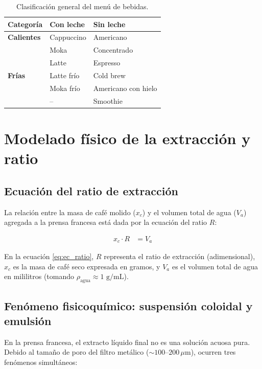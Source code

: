 \documentclass{article}
\begin{document}
\begin{table}[H]
	\centering
	\caption{Clasificación general del menú de bebidas.}
	\label{tab:menu_bebidas}
	\vspace{6pt}
	\begin{tabular}{lll}
		\toprule
		\textbf{Categoría} & \textbf{Con leche} & \textbf{Sin leche} \\
		\midrule
		\textbf{Calientes} & Cappuccino & Americano \\
		& Moka & Concentrado \\
		& Latte & Espresso \\
		\midrule
		\textbf{Frías} & Latte frío & Cold brew \\
		& Moka frío & Americano con hielo \\
		& -- & Smoothie \\
		\bottomrule
	\end{tabular}
\end{table}

\section{Modelado físico de la extracción y ratio}

\subsection{Ecuación del ratio de extracción}

La relación entre la masa de café molido ($x_c$) y el volumen total de agua ($V_a$) agregada a la prensa francesa está dada por la ecuación del ratio $R$:

\begin{equation}
	\begin{split}
		x_{c} \cdot R &= V_{a}
	\end{split} \label{eq:ec_ratio}
\end{equation}

En la ecuación \ref{eq:ec_ratio}, $R$ representa el ratio de extracción (adimensional), $x_c$ es la masa de café seco expresada en gramos, y $V_a$ es el volumen total de agua en mililitros (tomando $\rho_{\text{agua}} \approx 1\text{ g/mL}$).

\subsection{Fenómeno fisicoquímico: suspensión coloidal y emulsión}

En la prensa francesa, el extracto líquido final no es una solución acuosa pura. Debido al tamaño de poro del filtro metálico ($\sim 100\text{--}200\,\mu\text{m}$), ocurren tres fenómenos simultáneos:
\end{document}
